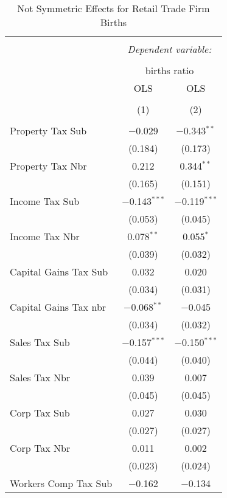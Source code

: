 
\begin{table}[!htbp] \centering 
  \caption{Not Symmetric Effects for  Retail Trade Firm Births} 
  \label{44-45noequality} 
\footnotesize 
\begin{tabular}{@{\extracolsep{5pt}}lcc} 
\\[-1.8ex]\hline 
\hline \\[-1.8ex] 
 & \multicolumn{2}{c}{\textit{Dependent variable:}} \\ 
\cline{2-3} 
\\[-1.8ex] & \multicolumn{2}{c}{births ratio} \\ 
 & OLS & OLS \\ 
\\[-1.8ex] & (1) & (2)\\ 
\hline \\[-1.8ex] 
 Property Tax Sub & $-$0.029 & $-$0.343$^{**}$ \\ 
  & (0.184) & (0.173) \\ 
  Property Tax Nbr & 0.212 & 0.344$^{**}$ \\ 
  & (0.165) & (0.151) \\ 
  Income Tax Sub & $-$0.143$^{***}$ & $-$0.119$^{***}$ \\ 
  & (0.053) & (0.045) \\ 
  Income Tax Nbr & 0.078$^{**}$ & 0.055$^{*}$ \\ 
  & (0.039) & (0.032) \\ 
  Capital Gains Tax Sub & 0.032 & 0.020 \\ 
  & (0.034) & (0.031) \\ 
  Capital Gains Tax nbr & $-$0.068$^{**}$ & $-$0.045 \\ 
  & (0.034) & (0.032) \\ 
  Sales Tax Sub & $-$0.157$^{***}$ & $-$0.150$^{***}$ \\ 
  & (0.044) & (0.040) \\ 
  Sales Tax Nbr & 0.039 & 0.007 \\ 
  & (0.045) & (0.045) \\ 
  Corp Tax Sub & 0.027 & 0.030 \\ 
  & (0.027) & (0.027) \\ 
  Corp Tax Nbr & 0.011 & 0.002 \\ 
  & (0.023) & (0.024) \\ 
  Workers Comp Tax Sub & $-$0.162 & $-$0.134 \\ 

\end{tabular}
\end{table}
